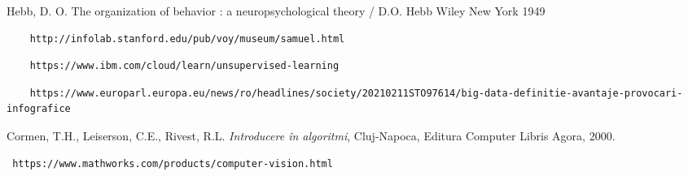 


\begin{thebibliography}{99}

 Hebb, D. O.  The organization of behavior : a neuropsychological theory / D.O. Hebb  Wiley New York  1949

 \begin{verbatim}
	http://infolab.stanford.edu/pub/voy/museum/samuel.html
\end{verbatim}

 \begin{verbatim}
	https://www.ibm.com/cloud/learn/unsupervised-learning
\end{verbatim}

 \begin{verbatim}
	https://www.europarl.europa.eu/news/ro/headlines/society/20210211STO97614/big-data-definitie-avantaje-provocari-infografice
\end{verbatim}





 Cormen,  T.H.,  Leiserson,  C.E.,  Rivest,  R.L. \textit{Introducere \^ in algoritmi}, Cluj-Napoca, Editura Computer Libris Agora, 2000.

 \begin{verbatim} https://www.mathworks.com/products/computer-vision.html
\end{verbatim}


\end{thebibliography}

